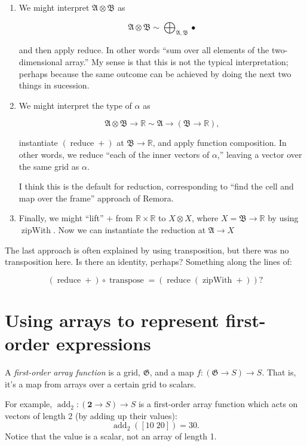 \documentclass[11pt]{article}
\newcommand{\gr}[1]{\mathfrak{#1}}
\newcommand{\R}{\mathbb{R}}
\newcommand{\unit}{\bullet}
\DeclareMathOperator{\reduce}{reduce}
\DeclareMathOperator{\zipWith}{zipWith}
\begin{document}
\begin{enumerate}
\item We might interpret \(\gr{A}\otimes\gr{B}\) as 

$$
   \gr{A}\otimes\gr{B} \sim \bigoplus_{\gr{A}, \gr{B}} \unit  
   $$

and then apply reduce. In other words “sum over all elements of the
two-dimensional array.” My sense is that this is not the typical
interpretation; perhaps because the same outcome can be achieved by doing the
next two things in sucession.

\item We might interpret the type of \(\alpha\) as

$$
   \gr{A}\otimes\gr{B}\to\R \sim \gr{A} \to (\gr{B}\to \R),
   $$

instantiate \((\reduce +)\) at \(\gr{B}\to\R\), and apply function
composition. In other words, we reduce “each of the inner vectors of
\(\alpha\),” leaving a vector over the same grid as \(\alpha\).

I think this is the default for reduction, corresponding to “find the cell
and map over the frame” approach of Remora.

\item Finally, we might “lift” \(+\) from \(\R\times \R\) to \(X\otimes X\), where \(X =
   \gr{B}\to\R\) by using \(\zipWith\). Now we can instantiate the reduction at
\(\gr{A}\to X\)
\end{enumerate}

The last approach is often explained by using transposition, but there was no
transposition here. Is there an identity, perhaps? Something along the lines of:

$$
(\reduce +) \circ \operatorname{transpose} = (\reduce (\zipWith +)) ? 
$$

\section{Using arrays to represent first-order expressions}
\label{sec:orgac340af}

A \emph{first-order array function} is a grid, \(\gr{G}\), and a map \(f: (\gr{G}\to
S)\to S\). That is, it's a map from arrays over a certain grid to scalars. 

For example, \(\operatorname{add}_2 : (\mathbf{2}\to S)\to S\) is a first-order
array function which acts on vectors of length 2 (by adding up their values):
$$
\operatorname{add}_2([10\; 20]) = 30.
$$ 
Notice that the value is a scalar, not an array of length 1.
\end{document}

